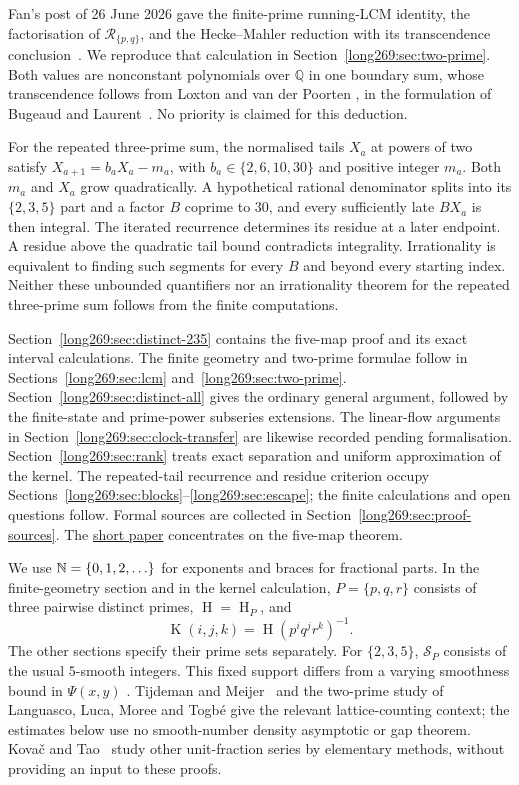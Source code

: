 \documentclass[11pt]{article}
\theoremstyle{remark}
\theoremstyle{plain}
\newcommand{\hgt}{\operatorname{H}}
\newcommand{\Kernel}{\operatorname{K}}
\begin{document}
Fan's post of 26 June 2026 gave the finite-prime running-LCM identity,
the factorisation of $\mathcal R_{\{p,q\}}$, and the Hecke--Mahler reduction
with its transcendence conclusion~\cite{fan2026comment}. We reproduce that
calculation in Section~\ref{long269:sec:two-prime}. Both values are
nonconstant polynomials over $\mathbb Q$ in one boundary sum, whose
transcendence follows from Loxton and van der Poorten
\cite[Theorem~8, p.~40]{loxtonvdp1977}, in the formulation of Bugeaud and
Laurent~\cite[Theorem~1.1]{bugeaudlaurent2023}. No priority is claimed for
this deduction.

For the repeated three-prime sum, the normalised tails $X_a$ at powers of
two satisfy $X_{a+1}=b_aX_a-m_a$, with $b_a\in\{2,6,10,30\}$ and positive
integer $m_a$. Both $m_a$ and $X_a$ grow quadratically. A hypothetical
rational denominator splits into its $\{2,3,5\}$ part and a factor $B$
coprime to $30$, and every sufficiently late $BX_a$ is then integral.
The iterated recurrence determines its residue at a later endpoint. A residue
above the quadratic tail bound contradicts integrality. Irrationality is
equivalent to finding such segments for every $B$ and beyond every starting
index. Neither these unbounded quantifiers nor an irrationality theorem
for the repeated three-prime sum follows from the finite computations.

Section~\ref{long269:sec:distinct-235} contains the five-map proof and
its exact interval calculations. The finite geometry and two-prime
formulae follow in Sections~\ref{long269:sec:lcm} and~\ref{long269:sec:two-prime}.
Section~\ref{long269:sec:distinct-all} gives the ordinary general argument,
followed by the finite-state and prime-power subseries extensions.
The linear-flow arguments in Section~\ref{long269:sec:clock-transfer}
are likewise recorded pending formalisation. Section~\ref{long269:sec:rank}
treats exact separation and uniform approximation of the kernel.
The repeated-tail recurrence and residue criterion occupy
Sections~\ref{long269:sec:blocks}--\ref{long269:sec:escape}; the finite
calculations and open questions follow. Formal sources are collected in
Section~\ref{long269:sec:proof-sources}. The
\href{erdos-269-three-prime-running-lcm.pdf\#r4-five-map-theorem}{short paper}
concentrates on the five-map theorem.

We use $\mathbb{N}=\{0,1,2,\ldots\}$ for exponents and braces for fractional parts.
In the finite-geometry section and in the kernel calculation, $P=\{p,q,r\}$ consists
of three pairwise distinct primes, $\hgt=\hgt_P$, and
\[
 \Kernel(i,j,k)=\hgt(p^iq^jr^k)^{-1}.
\]
The other sections specify their prime sets separately. For $\{2,3,5\}$,
$\mathcal S_P$ consists of the usual $5$-smooth integers. This fixed support
differs from a varying smoothness bound in $\Psi(x,y)$
\cite{hildebrand1986}. Tijdeman and Meijer~\cite[Sections~1--4]{tijdemanmeijer1974}
and the two-prime study of Languasco, Luca, Moree and Togb\'e
\cite{languasco2025} give the relevant lattice-counting context; the
estimates below use no smooth-number density asymptotic or gap theorem.
Kova\v{c} and Tao~\cite{kovactao2024} study other unit-fraction series by
elementary methods, without providing an input to these proofs.
\end{document}
